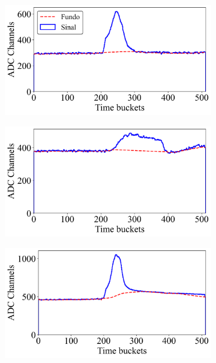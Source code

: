 \documentclass[a4paper,12pt,oneside]{book}
\begin{document}
\begin{figure}[H]
\centering
    \begin{subfigure}[b]{0.48\textwidth}
        \centering
        \includegraphics[scale=0.394]{figs/ex_sinal_bkg_1.png}
        \caption{}
        \label{subfig:ex_sinal_bkg_1}
    \end{subfigure}%
    \hfill
    \begin{subfigure}[b]{0.48\textwidth}
        \centering
        \includegraphics[scale=0.394]{figs/ex_sinal_bkg_2.png}
        \caption{}
        \label{subfig:ex_sinal_bkg_2}
    \end{subfigure}
    \begin{subfigure}[b]{0.48\textwidth}
        \centering
        \includegraphics[scale=0.394]{figs/ex_sinal_bkg_3.png}

\end{subfigure}
\end{figure}
\end{document}
